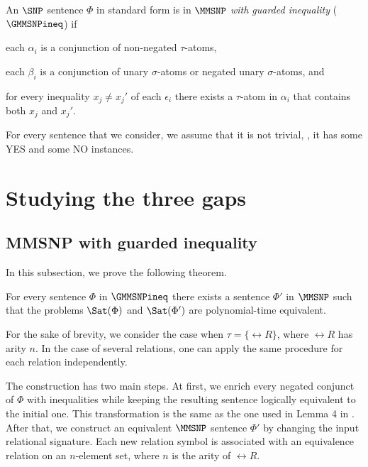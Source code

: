 \documentclass{lmcs}
\begin{document}
\begin{defi}\label{def:gmmsnpineq} 
An $\SNP$ sentence $\Phi$ in standard form is in \emph{$\MMSNP$ with guarded inequality} ($\GMMSNPineq$) if
\begin{inparaenum}[(a)]
\item each $\alpha_i$ is a conjunction of non-negated $\tau$-atoms,
\item each $\beta_i$ is a conjunction of unary $\sigma$-atoms or negated unary $\sigma$-atoms, and
\item for every inequality $x_j\not=x_j'$ of each $\epsilon_i$ there exists a $\tau$-atom in $\alpha_i$ that contains both $x_j$ and $x_j'$.
\end{inparaenum}
\end{defi}

\begin{rem}\label{remark:yes_no_instance}
For every sentence that we consider, we assume that it is not trivial, \ie, it has some YES and some NO instances.
\end{rem} 



\section{Studying the three gaps}\label{section:gaps}
\subsection{MMSNP with guarded inequality}\label{section:gmmsnpineq}




In this subsection, we prove the following theorem.
\begin{thm}\label{th:gmmsnpineq_embeds_mmsnp} 
For every sentence $\Phi$ in $\GMMSNPineq$ there exists a sentence $\Phi'$ in $\MMSNP$ such that the problems $\Sat(\Phi)$ and $\Sat(\Phi')$ are polynomial-time equivalent.
\end{thm}




For the sake of brevity, we consider the case when $\tau = \{\rel{R}\}$, where $\rel{R}$ has
arity $n$. 
%
In the case of several relations, one can apply the same procedure for each relation independently.

The construction has two main steps.
%
At first, we enrich every negated conjunct of $\Phi$ with inequalities while keeping the resulting sentence logically equivalent to the initial one.
%
This transformation is the same as the one used in Lemma 4 in \cite{federV03}.
%
After that, we construct an equivalent $\MMSNP$ sentence $\Phi'$ by changing the input relational signature.
%
Each new relation symbol is associated with an equivalence relation on an $n$-element set, where $n$ is the arity of $\rel{R}$.
\end{document}
